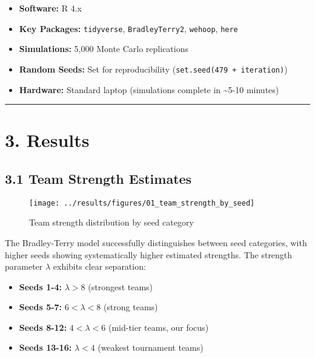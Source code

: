 \documentclass[
]{article}
\providecommand{\tightlist}{%
  \setlength{\itemsep}{0pt}\setlength{\parskip}{0pt}}
\begin{document}
\begin{itemize}
\tightlist
\item
  \textbf{Software:} R 4.x
\item
  \textbf{Key Packages:} \texttt{tidyverse}, \texttt{BradleyTerry2},
  \texttt{wehoop}, \texttt{here}
\item
  \textbf{Simulations:} 5,000 Monte Carlo replications
\item
  \textbf{Random Seeds:} Set for reproducibility
  (\texttt{set.seed(479\ +\ iteration)})
\item
  \textbf{Hardware:} Standard laptop (simulations complete in
  \textasciitilde5-10 minutes)
\end{itemize}

\begin{center}\rule{0.5\linewidth}{0.5pt}\end{center}

\section{3. Results}\label{results}

\subsection{3.1 Team Strength Estimates}\label{team-strength-estimates}

\begin{figure}

{\centering \texttt{[image: ../results/figures/01\_team\_strength\_by\_seed]} 

}

\caption{Team strength distribution by seed category}\label{fig:team-strength-plot}
\end{figure}

The Bradley-Terry model successfully distinguishes between seed
categories, with higher seeds showing systematically higher estimated
strengths. The strength parameter \(\lambda\) exhibits clear separation:

\begin{itemize}
\tightlist
\item
  \textbf{Seeds 1-4:} \(\lambda > 8\) (strongest teams)
\item
  \textbf{Seeds 5-7:} \(6 < \lambda < 8\) (strong teams)
\item
  \textbf{Seeds 8-12:} \(4 < \lambda < 6\) (mid-tier teams, our focus)
\item
  \textbf{Seeds 13-16:} \(\lambda < 4\) (weakest tournament teams)
\end{itemize}
\end{document}
